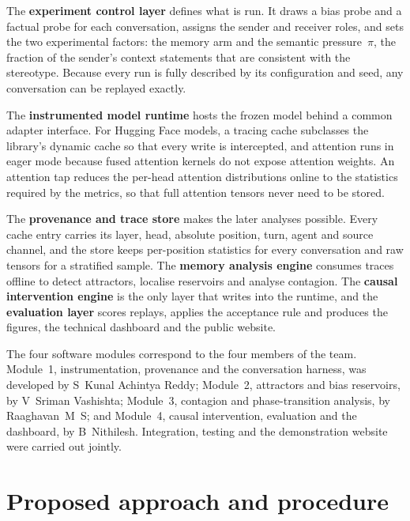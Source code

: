 The \textbf{experiment control layer} defines what is run. It draws a bias probe and a factual probe for each conversation, assigns the sender and receiver roles, and sets the two experimental factors: the memory arm and the semantic pressure~$\pi$, the fraction of the sender's context statements that are consistent with the stereotype. Because every run is fully described by its configuration and seed, any conversation can be replayed exactly.

The \textbf{instrumented model runtime} hosts the frozen model behind a common adapter interface. For Hugging Face models, a tracing cache subclasses the library's dynamic cache so that every write is intercepted, and attention runs in eager mode because fused attention kernels do not expose attention weights. An attention tap reduces the per-head attention distributions online to the statistics required by the metrics, so that full attention tensors never need to be stored.

The \textbf{provenance and trace store} makes the later analyses possible. Every cache entry carries its layer, head, absolute position, turn, agent and source channel, and the store keeps per-position statistics for every conversation and raw tensors for a stratified sample. The \textbf{memory analysis engine} consumes traces offline to detect attractors, localise reservoirs and analyse contagion. The \textbf{causal intervention engine} is the only layer that writes into the runtime, and the \textbf{evaluation layer} scores replays, applies the acceptance rule and produces the figures, the technical dashboard and the public website.

The four software modules correspond to the four members of the team. Module~1, instrumentation, provenance and the conversation harness, was developed by S~Kunal Achintya Reddy; Module~2, attractors and bias reservoirs, by V~Sriman Vashishta; Module~3, contagion and phase-transition analysis, by Raaghavan~M~S; and Module~4, causal intervention, evaluation and the dashboard, by B~Nithilesh. Integration, testing and the demonstration website were carried out jointly.

\section{Proposed approach and procedure}
